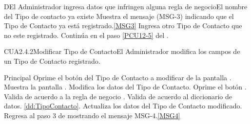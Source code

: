         \begin{UCtrayectoriaA}{D}{El Administrador ingresa datos que infringen alguna regla de negocio}{El nombre del Tipo de contacto ya existe}
                        \UCpaso Muestra el mensaje (MSG-3) indicando que el Tipo de Contacto ya está registrado.\ref{MSG3}
			\UCpaso[\UCactor] Ingresa otro Tipo de Contacto que no este registrado.
			\UCpaso Continúa en el paso \ref{PCU12-5} del .
	\end{UCtrayectoriaA}



	\begin{UseCase}{CUA2.4.2}{Modificar Tipo de Contacto}{El Administrador modifica los campos de un Tipo de Contacto registrado.}
	\end{UseCase}

	\begin{UCtrayectoria}{Principal}
			\UCpaso[\UCactor] Oprime el botón  del Tipo de Contacto a modificar de la pantalla .
			\UCpaso Muestra la pantalla .
                        \UCpaso [\UCactor] Modifica los datos del Tipo de Contacto.
                       	\UCpaso [\UCactor] Oprime el botón .
                        \UCpaso Valida de acuerdo a la regla de negocio .  
                        \UCpaso Valida de acuerdo al diccionario de datos. \ref{dd:TipoContacto}.
			\UCpaso Actualiza los datos del Tipo de Contacto modificado.
			\UCpaso Regresa al paso 3 de  mostrando el mensaje MSG-4.\ref{MSG4}
	\end{UCtrayectoria}

